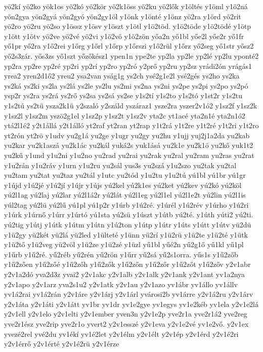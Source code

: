 {yö2kí
yö2ko
yök1os
yö2kó
yö2kör
yö2k1öss
yö2ku
yö2lők
y1öltés
y1öml
y1ö2ná
yön2gya
yön2gyá
yön2gyó
yön2gy1öl
y1önk
y1önté
y1önz
yö2ra
y1örd
yö2rit
yö2ro
yö2ru
yö2so
y1össz
y1ösv
y1öszt
y1ötl
y1ö2töd.
y1ö2töde
y1ö2tödé
y1ötp
y1ött
y1ötv
yö2ve
yö2vé
yö2vi
y1ö2vö
y1ö2zön
yőa2n
yő1bl
yőe2l
yőe2r
yő1fr
yő1pr
yő2ra
y1ő2rei
y1őrg
y1őrl
y1őrp
y1őrszi
y1ő2rül
y1őrz
yő2seg
yő1str
yősz2
yő2s3zár.
yős3zs
yő1szt
yőzőkész1
ypen1n
ype2te
yp2la
yp2le
yp2lé
yp2lu
yponté2
yp2ra
yp2re
yp2ré
yp2ri
yp2rí
yp2ro
yp2ró
y2prő
yp2ru
yp2sz
yrádi2ón
yrágás1
yrea2
yren2d1ő2
yreu2
ysa2van
yság1g
ys2ch
ysé2g1e2l
ysé2gés
ys2ho
ys2ka
ys2ká
ys2ki
ys2la
ys2lá
ys2le
ys2lu
ys2mi
ys2na
ys2ni
ys2pe
ys2pi
ys2po
ys2pó
ysp2r
ys2ra
ys2rá
ys2rő
ys2sa
ys2sá
ys2se
y1s2tí
y1s2to
y1s2tó
y1st2r
y1s2tu
y1s2tú
ys2tü
ysza2k1ü
y2szaló
y2száld
yszáraz1
ysze2ra
yszer2v1ó2
y1sz2f
y1sz2k
y1sz2l
y1sz2m
yszö2g1el
y1sz2p
y1sz2t
y1sz2v
yta2c
yt1acé
yta2n1é
yta2n1ó2
ytá2l1é2
y2t1állá
y2t1álló
yt2raf
yt2ran
yt2rap
y1t2rá
y1t2re
y1t2ré
y1t2ri
y1t2ro
yt2rón
yt2rö
y1udv
yu2g1á
yu2ge
y1ugr
yu2gy
yu2hu
y1ujj
yuj2j1a2da
yu2kab
yu2kar
yu2k1aszá
yu2k1ác
yu2kál
yuká2s
yuk1ásá
yu2k1e
yu2k1ö
yu2kő
yuk1t2
yu2kű
y1und
y1u2ni
y1u2no
yu2rad
yu2rai
yu2rak
yu2ral
yu2ram
yu2ras
yu2rat
y1u2rán
y1u2ráv
y1urn
y1u2ru
yu2sál
yus3s
yu2szá
y1u2szo
yu2tak
yu2tal
yu2tam
yu2tat
yu2taz
yu2tál
y1utc
yu2tód
y1u2tu
y1u2tú
yú1bl
yú1br
yú1gr
y1újd
y1ú2jé
y1ú2jí
y1újr
y1újs
yú2kel
yú2k1es
yú2ket
yú2kev
yú2kó
yú2köl
yú2l1ag
yú2laj
yú2lar
yú2l1á2r
yú2lát
yú2l1eg
yú2l1el
yú2l1e2t
yú2lin
yú2l1is
yúl2tag
yú2lü
yú2lű
yú1pl
yú1p2r
y1úrb
y1ú2ré.
y1úrél
y1ú2rév
y1úrho
y1ú2ri
y1úrk
y1úrnő
y1úrr
y1úrtó
yú1sta
yú2sü
y1úszt
y1útb
yú2té.
y1úth
yúti2
yú2ti.
yú2tig
y1útj
y1útk
y1útm
y1útn
y1ú2ton
y1útp
y1útr
y1úts
y1útt
y1útv
yü2dü
y1ü2gy
yü2két
yü2lá
yü2led
y1ülteté
y1ünn
yü2rí
y1ü2rü
y1ü2te
y1ü2té
y1ütk
y1ü2tő
y1ü2veg
yü2völ
y1ü2ze
y1ü2zé
y1üzl
yű1bl
yűé2n
yű2g1ő
yű1kl
yű1pl
y1űrb
y1ű2ré.
yű2réb
yű2rén
yű2rön
y1űrr
yű2sá
yű2s1orra.
yűs1s
y1ű2zőb
y1ű2zően
y1ű2zőé
y1ű2zőh
y1ű2zők
y1ű2zőn
y1ű2zőr
y1ű2zőt
y1ű2zőv
y2v1abr
y2v1a2dó
yva2d3z
yvai2
y2v1akc
y2v1alb
y2v1alk
y2v1ank
y2v1ant
yv1a2nya
y2v1apo
y2v1arz
yva2s1u2
y2v1atk
y2v1au
y2v1azo
yv1ábr
yv1állo
yv1állv
yv1á2rai
yv1á2rán
y2v1áre
y2v1árj
y2v1árl
yvárosi2b
yv1árre
y2v1á2ru
y2v1árv
y2v1áta
y2v1áti
y2v1átt
yv1br
yv1dr
yv1e2gye
yv1egys
yv1e2kéb
yv1ela
y2v1e2lá
y2v1ell
y2v1elo
y2v1elti
y2v1ember
yven3n
y2v1e2p
yve2r1a
yve2r1á2
yve2reg
yve2r1ész
yve2rip
yve2r1o
yvert2
y2v1esszé
y2v1eva
y2v1e2vé
yv1e2vő.
y2v1ex
yvezé2rel
yvé2du
yv1ékí
yv1é2let
y2v1élm
y2v1élt
y2v1ép
y2v1érd
y2v1é2ri
y2v1érrő
y2v1érté
y2v1é2rü
y2v1érze
}
